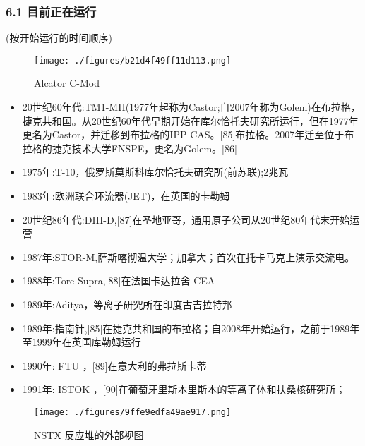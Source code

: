 \subsubsection{6.1 目前正在运行}
(按开始运行的时间顺序)
\begin{figure}[ht]
\centering
\texttt{[image: ./figures/b21d4f49ff11d113.png]}
\caption{Alcator C-Mod} \label{fig_TKMK_7}
\end{figure}
\begin{itemize}
\item 20世纪60年代:TM1-MH(1977年起称为Castor;自2007年称为Golem)在布拉格，捷克共和国。从20世纪60年代早期开始在库尔恰托夫研究所运行，但在1977年更名为Castor，并迁移到布拉格的IPP CAS。[85]布拉格。2007年迁至位于布拉格的捷克技术大学FNSPE，更名为Golem。[86]
\item 1975年:T-10，俄罗斯莫斯科库尔恰托夫研究所(前苏联);2兆瓦
\item 1983年:欧洲联合环流器(JET)，在英国的卡勒姆
\item 20世纪86年代:DIII-D,[87]在圣地亚哥，通用原子公司从20世纪80年代末开始运营
\item 1987年:STOR-M,萨斯喀彻温大学；加拿大；首次在托卡马克上演示交流电。
\item 1988年:Tore Supra,[88]在法国卡达拉舍 CEA
\item 1989年:Aditya，等离子研究所在印度古吉拉特邦
\item 1989年:指南针,[85]在捷克共和国的布拉格；自2008年开始运行，之前于1989年至1999年在英国库勒姆运行
\item 1990年: FTU ，[89]在意大利的弗拉斯卡蒂
\item 1991年: ISTOK ，[90]在葡萄牙里斯本里斯本的等离子体和扶桑核研究所；
\end{itemize}
\begin{figure}[ht]
\centering
\texttt{[image: ./figures/9ffe9edfa49ae917.png]}
\caption{NSTX 反应堆的外部视图} \label{fig_TKMK_8}
\end{figure}
